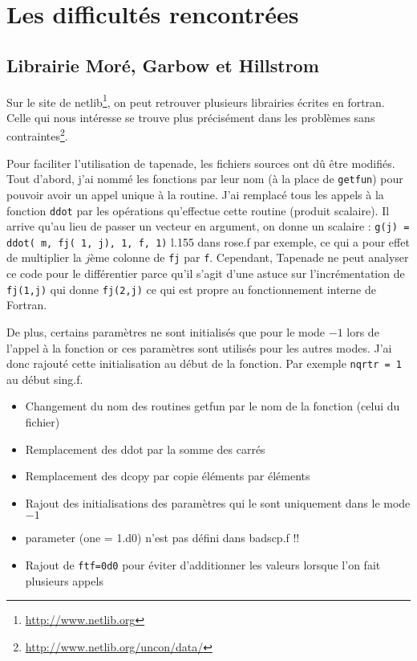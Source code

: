 


\chapter{Les difficult\'es rencontr\'ees}
\label{annexe:C}

\section{Librairie Mor\'e, Garbow et Hillstrom}


Sur le site de netlib\footnote{\url{http://www.netlib.org}}, on peut retrouver plusieurs librairies \'ecrites en fortran.
Celle qui nous int\'eresse se trouve plus pr\'ecis\'ement dans les probl\`emes sans contraintes\footnote{\url{http://www.netlib.org/uncon/data/}}.


Pour faciliter l'utilisation de tapenade, les fichiers sources ont dû être modifi\'es.
Tout d'abord, j'ai nomm\'e les fonctions par leur nom (\`a la place de {\tt getfun}) pour pouvoir avoir un appel
unique \`a la routine. J'ai remplac\'e tous les appels \`a la fonction {\tt ddot} par les op\'erations 
qu'effectue cette routine (produit scalaire). 
Il arrive qu'au lieu de passer un vecteur en argument, on donne un scalaire : {\tt g(j) = ddot( m, fj( 1, j), 1, f, 1)} l.155
 dans rose.f par exemple, ce qui a pour effet de multiplier la $j$\`eme colonne de {\tt fj} par {\tt f}. Cependant, Tapenade ne peut analyser
ce code pour le diff\'erentier parce qu'il s'agit d'une astuce sur l'incr\'ementation de {\tt fj(1,j)} qui donne {\tt fj(2,j)} ce qui est 
propre au fonctionnement interne de Fortran.




De plus, certains param\`etres ne sont initialis\'es que pour le mode $-1$ lors de l'appel \`a la fonction or 
ces param\`etres sont utilis\'es pour les autres modes. J'ai donc rajout\'e cette initialisation au d\'ebut de 
la fonction. Par exemple {\tt nqrtr  = 1} au d\'ebut sing.f.





\begin{itemize}
\item Changement du nom des routines getfun par le nom de la fonction (celui du fichier)
\item Remplacement des ddot par la somme des carr\'es
\item Remplacement des dcopy par copie \'el\'ements par \'el\'ements
\item Rajout des initialisations des param\`etres qui le sont uniquement dans le mode $-1$
\item parameter (one = 1.d0) n'est pas d\'efini dans badscp.f !! 
\item Rajout de {\tt ftf=0d0} pour \'eviter d'additionner les valeurs lorsque l'on fait plusieurs appels
\end{itemize}

